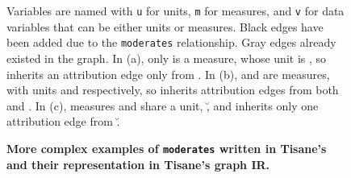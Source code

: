 {\begin{figure}[H]
       \caption{\textbf{More complex examples of \texttt{moderates} written in Tisane's \SDSLlong and their representation in Tisane's graph IR.}}
        \begin{small}
        \begin{minipage}{\linewidth}
            Variables are named with \texttt{u} for units, \texttt{m} for measures, and \texttt{v} for data variables that can be either units or measures. Black edges have been added due to the \texttt{moderates} relationship. Gray edges already existed in the graph. In (a), only \mone is a measure, whose unit is \utwo, so \umone inherits an attribution edge only from \utwo. In (b), \mone and \mtwo are measures, with units \uone and \utwo respectively, so \monetwo inherits attribution edges from both \uone and \utwo. In (c), measures \mone and \mtwo share a unit, \u, and \monetwo inherits only one attribution edge from \u.
        \end{minipage}
        \end{small}
       \label{fig:figureComplexModeratesGraphIR}
   \end{figure}
}


